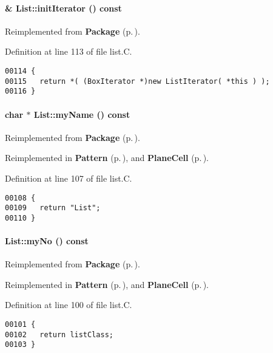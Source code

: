 \paragraph{ \& List::init\-Iterator () const\hspace{0.3cm}{\tt  [virtual]}}\hfill



Reimplemented from {\bf Package} {\rm (p.\,\pageref{Package_a6})}.

Definition at line 113 of file list.C.\small\begin{verbatim}00114 {
00115   return *( (BoxIterator *)new ListIterator( *this ) );
00116 }
\end{verbatim}\normalsize 
\label{List_a7}
\paragraph{\setlength{\rightskip}{0pt plus 5cm}char $\ast$ List::my\-Name () const\hspace{0.3cm}{\tt  [virtual]}}\hfill



Reimplemented from {\bf Package} {\rm (p.\,\pageref{Package_a9})}.

Reimplemented in {\bf Pattern} {\rm (p.\,\pageref{Pattern_a3})}, and {\bf Plane\-Cell} {\rm (p.\,\pageref{PlaneCell_a3})}.

Definition at line 107 of file list.C.\small\begin{verbatim}00108 {
00109   return "List";
00110 }
\end{verbatim}\normalsize 
\label{List_a6}
\paragraph{ List::my\-No () const\hspace{0.3cm}{\tt  [virtual]}}\hfill



Reimplemented from {\bf Package} {\rm (p.\,\pageref{Package_a8})}.

Reimplemented in {\bf Pattern} {\rm (p.\,\pageref{Pattern_a2})}, and {\bf Plane\-Cell} {\rm (p.\,\pageref{PlaneCell_a2})}.

Definition at line 100 of file list.C.\small\begin{verbatim}00101 {
00102   return listClass;
00103 }
\end{verbatim}\normalsize 
\label{List_a2}
